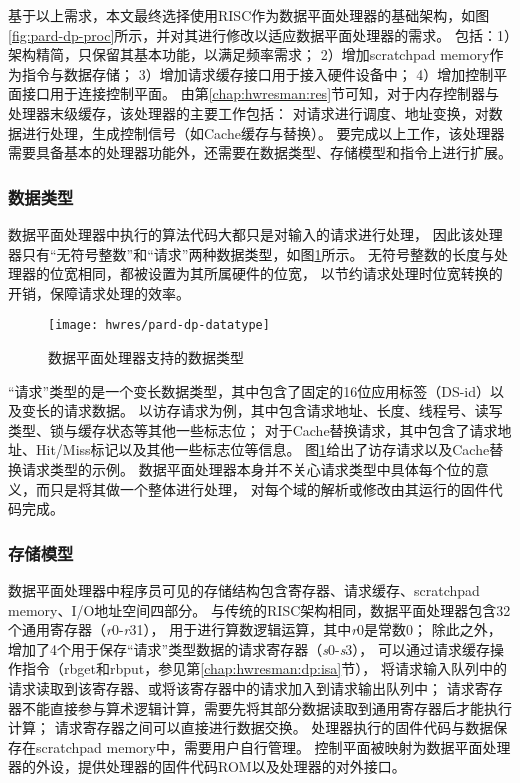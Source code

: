 基于以上需求，本文最终选择使用RISC作为数据平面处理器的基础架构，如图\ref{fig:pard-dp-proc}所示，并对其进行修改以适应数据平面处理器的需求。
包括：1）架构精简，只保留其基本功能，以满足频率需求；
2）增加scratchpad memory作为指令与数据存储；
3）增加请求缓存接口用于接入硬件设备中；
4）增加控制平面接口用于连接控制平面。
由第\ref{chap:hwresman:res}节可知，对于内存控制器与处理器末级缓存，该处理器的主要工作包括：
对请求进行调度、地址变换，对数据进行处理，生成控制信号（如Cache缓存与替换）。
要完成以上工作，该处理器需要具备基本的处理器功能外，还需要在数据类型、存储模型和指令上进行扩展。

\subsubsection{数据类型}

数据平面处理器中执行的算法代码大都只是对输入的请求进行处理，
因此该处理器只有``无符号整数''和``请求''两种数据类型，如图\ref{fig:pard-dp-datatype}所示。
无符号整数的长度与处理器的位宽相同，都被设置为其所属硬件的位宽，
以节约请求处理时位宽转换的开销，保障请求处理的效率。

\begin{figure}[H]
  \centering
  \texttt{[image: hwres/pard-dp-datatype]}
  \caption{数据平面处理器支持的数据类型}
  \label{fig:pard-dp-datatype}
\end{figure}
 
``请求''类型的是一个变长数据类型，其中包含了固定的16位应用标签（DS-id）以及变长的请求数据。
以访存请求为例，其中包含请求地址、长度、线程号、读写类型、锁与缓存状态等其他一些标志位；
对于Cache替换请求，其中包含了请求地址、Hit/Miss标记以及其他一些标志位等信息。
图\ref{fig:pard-dp-datatype}给出了访存请求以及Cache替换请求类型的示例。
数据平面处理器本身并不关心请求类型中具体每个位的意义，而只是将其做一个整体进行处理，
对每个域的解析或修改由其运行的固件代码完成。

\subsubsection{存储模型}
数据平面处理器中程序员可见的存储结构包含寄存器、请求缓存、scratchpad memory、I/O地址空间四部分。
与传统的RISC架构相同，数据平面处理器包含32个通用寄存器（\textit{r}0-\textit{r}31），
用于进行算数逻辑运算，其中\textit{r}0是常数0；
除此之外，增加了4个用于保存``请求''类型数据的请求寄存器（\textit{s}0-\textit{s}3），
可以通过请求缓存操作指令（rbget和rbput，参见第\ref{chap:hwresman:dp:isa}节），
将请求输入队列中的请求读取到该寄存器、或将该寄存器中的请求加入到请求输出队列中；
请求寄存器不能直接参与算术逻辑计算，需要先将其部分数据读取到通用寄存器后才能执行计算；
请求寄存器之间可以直接进行数据交换。
处理器执行的固件代码与数据保存在scratchpad memory中，需要用户自行管理。
控制平面被映射为数据平面处理器的外设，提供处理器的固件代码ROM以及处理器的对外接口。

